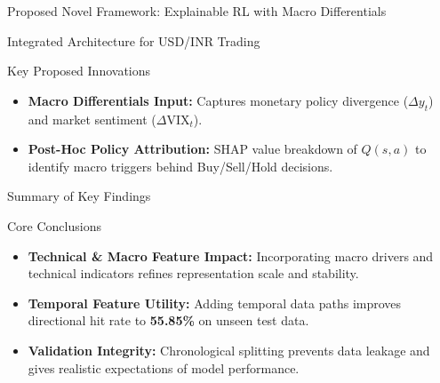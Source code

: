 \documentclass[aspectratio=169]{beamer}
\begin{document}
\begin{frame}{Proposed Novel Framework: Explainable RL with Macro Differentials}
	\begin{block}{Integrated Architecture for USD/INR Trading}
	\end{block}

	\begin{center}
	\end{center}

	\begin{block}{Key Proposed Innovations}
		\begin{itemize}
			\item \textbf{Macro Differentials Input:} Captures monetary policy divergence ($\Delta y_t$) and market sentiment ($\Delta \text{VIX}_t$).
			\item \textbf{Post-Hoc Policy Attribution:} SHAP value breakdown of $Q(s,a)$ to identify macro triggers behind Buy/Sell/Hold decisions.
		\end{itemize}
	\end{block}
\end{frame}

\begin{frame}{Summary of Key Findings}
	\begin{block}{Core Conclusions}
		\begin{itemize}
			\item \textbf{Technical \& Macro Feature Impact:} Incorporating macro drivers and technical indicators refines representation scale and stability.
			\item \textbf{Temporal Feature Utility:} Adding temporal data paths improves directional hit rate to \textbf{55.85\%} on unseen test data.
			\item \textbf{Validation Integrity:} Chronological splitting prevents data leakage and gives realistic expectations of model performance.
		\end{itemize}
	\end{block}
\end{frame}
\end{document}
